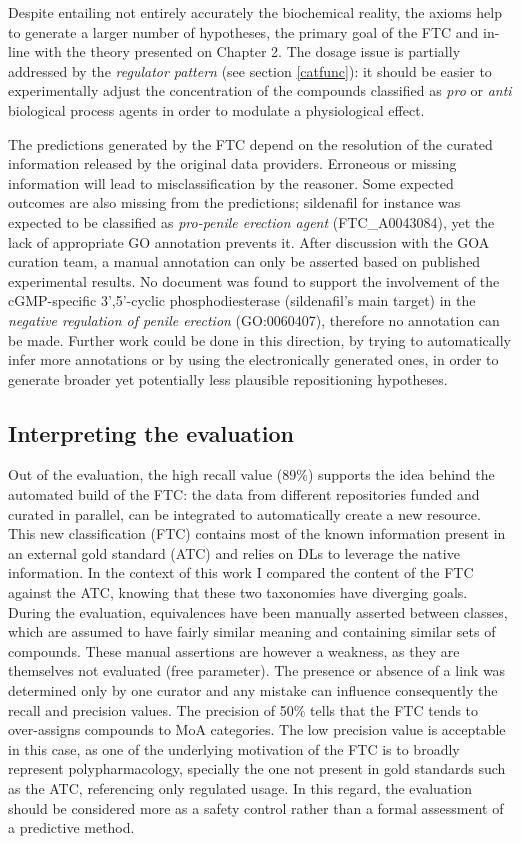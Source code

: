 Despite entailing not entirely accurately the biochemical reality, the axioms help to generate a larger number of hypotheses, the primary goal of the FTC and in-line with the theory presented on Chapter 2. The dosage issue is partially addressed by the \emph{regulator pattern} (see section \ref{catfunc}): it should be easier to experimentally adjust the concentration of the compounds classified as \emph{pro} or \emph{anti} biological process agents in order to modulate a physiological effect.

The predictions generated by the FTC depend on the resolution of the curated information released by the original data providers. Erroneous or missing information will lead to misclassification by the reasoner. Some expected outcomes are also missing from the predictions; sildenafil for instance was expected to be classified as \emph{pro-penile erection agent} (FTC\_A0043084), yet the lack of appropriate GO annotation prevents it. After discussion with the GOA curation team, a manual annotation can only be asserted based on published experimental results. No document was found to support the involvement of the cGMP-specific 3',5'-cyclic phosphodiesterase (sildenafil's main target) in the \emph{negative regulation of penile erection} (GO:0060407), therefore no annotation can be made. Further work could be done in this direction, by trying to automatically infer more annotations or by using the electronically generated ones, in order to generate broader yet potentially less plausible repositioning hypotheses.

\subsection{Interpreting the evaluation}
Out of the evaluation, the high recall value (89\%) supports the idea behind the automated build of the FTC: the data from different repositories funded and curated in parallel, can be integrated to automatically create a new resource. This new classification (FTC) contains most of the known information present in an external gold standard (ATC) and relies on DLs to leverage the native information. In the context of this work I compared the content of the FTC against the ATC, knowing that these two taxonomies have diverging goals. During the evaluation, equivalences have been manually asserted between classes, which are assumed to have fairly similar meaning and containing similar sets of compounds. These manual assertions are however a weakness, as they are themselves not evaluated (free parameter). The presence or absence of a link was determined only by one curator and any mistake can influence consequently the recall and precision values. The precision of 50\% tells that the FTC tends to over-assigns compounds to MoA categories. The low precision value is acceptable in this case, as one of the underlying motivation of the FTC is to broadly represent polypharmacology, specially the one not present in gold standards such as the ATC, referencing only regulated usage. In this regard, the evaluation should be considered more as a safety control rather than a formal assessment of a predictive method.

